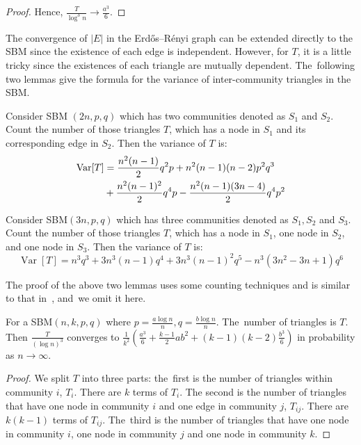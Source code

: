\documentclass[entropy,article,accept,moreauthors,pdftex]{Definitions/mdpi}
\newcommand{\1}{\mathbbm{1}}
\DeclareMathOperator{\Var}{Var}
\begin{document}
\begin{paracol}{2}
\begin{proof}
	Hence, $\frac{T}{\log^3 n} \to \frac{a^3}{6}$.
\end{proof}
The convergence of $|E|$ in the Erdős–Rényi %
graph can be extended directly to the SBM since the existence of each edge is independent.
However, for $T$, it is a little tricky since the existences of each triangle are mutually dependent. The~following two lemmas
give the formula for the variance of inter-community triangles in the SBM.
\begin{Lemma}\label{lem:SBM_tr_counting_cross}
	Consider SBM $(2n, p, q)$ which has two communities denoted as $S_1$ and $S_2$.
    Count the number of those triangles $T$, which has a node in $S_1$ and its corresponding edge in $S_2$.
Then the variance of $T$ is:
\begin{align}
\Var[T] & = \frac{n^2(n-1)}{2}q^2p + n^2(n-1)(n-2)p^2q^3 \notag \\
& + \frac{n^2(n-1)^2}{2}q^4p - \frac{n^2(n-1)(3n-4)}{2}q^4 p^2 \label{eq:SBM_tr_counting_cross}
\end{align}
\end{Lemma}
\begin{Lemma}\label{lem:SBM_tr_counting_3}
	Consider SBM$(3n, p, q)$ which has three communities denoted as $S_1, S_2$ and $S_3$.
	Count the number of those triangles $T$, which has a node in $S_1$, one node in $S_2$, and one node in $S_3$.
	Then the variance of $T$ is:
	\begin{equation*}\label{eq:SBM_tr_counting_three}
	\Var[T] = n^3 q^3  + 3n^3(n-1) q^4  + 3 n^3 (n-1)^2 q^5 - n^3(3n^2-3n+1)q^6
	\end{equation*}
\end{Lemma}
The proof of the above two lemmas uses some counting techniques and is similar to that in~\cite{holland1977method}, and~we omit it here.
\begin{Lemma}\label{lem:sbmV}
	For a SBM$(n, k, p, q)$ where $p=\frac{a\log n}{n}, q = \frac{b\log n}{n}$. The~number of triangles is $T$.
	Then $\frac{T}{(\log n)^3}$ converges to $\frac{1}{k^2}(\frac{a^3}{6} + \frac{k-1}{2}ab^2 + (k-1)(k-2)\frac{b^3}{6} )$ in probability as $n \to \infty$.
\end{Lemma}
\begin{proof}
	We split $T$ into three parts: the~first is the number of triangles within community $i$, $T_i$. There are $k$ terms of $T_i$.
	The second is the number of triangles that have one node in community $i$ and one edge in community $j$, $T_{ij}$. There are $k(k-1)$ terms of $T_{ij}$. The~third is the number of triangles that have one node in community $i$, one node in community $j$ and one node in community $k$.
	

\end{proof}
\end{paracol}
\end{document}
